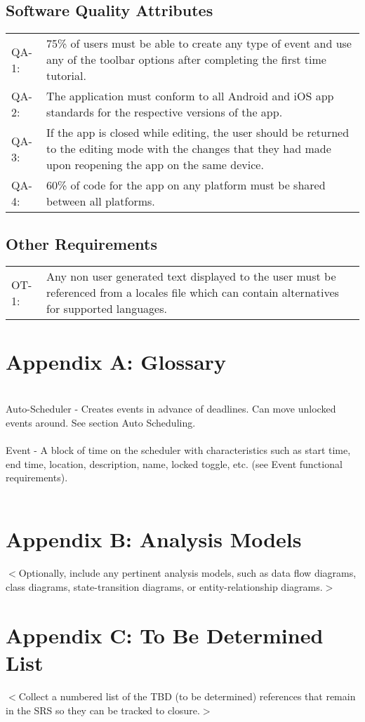 \documentclass{scrreprt}
\begin{document}
\section{Software Quality Attributes}
\begin{center}
\begin{tabular}{ p{1.5cm} p{13cm} }
QA-1: & 75\% of users must be able to create any type of event and use any of the
toolbar options after completing the first time tutorial.\\
QA-2: & The application must conform to all Android and iOS app standards for the
respective versions of the app.\\
QA-3: & If the app is closed while editing, the user should be returned to the editing
mode with the changes that they had made upon reopening the app on the same device.\\
QA-4: & 60\% of code for the app on any platform must be shared between all platforms.
\end{tabular}
\end{center}

\section{Other Requirements}
\begin{center}
\begin{tabular}{ p{1.5cm} p{13cm} }
OT-1: & Any non user generated text displayed to the user must be referenced from
a locales file which can contain alternatives for supported languages.\\
\end{tabular}
\end{center}

\chapter{Appendix A: Glossary}
\\
Auto-Scheduler - Creates events in advance of deadlines. Can move unlocked events around.
See section Auto Scheduling.\\
\\
Event - A block of time on the scheduler with characteristics such as start time, end time, 
location, description, name, locked toggle, etc. (see Event functional requirements).\\
\\

\chapter{Appendix B: Analysis Models}
$<$Optionally, include any pertinent analysis models, such as data flow
diagrams, class diagrams, state-transition diagrams, or entity-relationship
diagrams.$>$

\chapter{Appendix C: To Be Determined List}
$<$Collect a numbered list of the TBD (to be determined) references that remain
in the SRS so they can be tracked to closure.$>$
\end{document}
